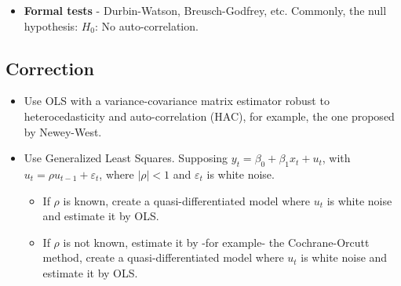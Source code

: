 \documentclass[10pt, a4paper, landscape]{extarticle}
\begin{document}
\begin{multicols}{3}
\begin{itemize}[leftmargin=*]
\begin{multicols}{3}
\begin{center}
				\end{center}
			\end{multicols}
			\item \textbf{Formal tests} - Durbin-Watson, Breusch-Godfrey, etc. Commonly, the null hypothesis: $H_0$: No auto-correlation.
		\end{itemize}
	\subsection*{Correction}
		\begin{itemize}[leftmargin=*]
			\item Use OLS with a variance-covariance matrix estimator robust to heterocedasticity and auto-correlation (HAC), for example, the one proposed by Newey-West.
			\item Use Generalized Least Squares. Supposing $y_t = \beta_0 + \beta_1 x_t + u_t$, with $u_t = \rho u_{t-1} + \varepsilon_t$, where $|\rho| < 1$ and $\varepsilon_t$ is white noise.
			\begin{itemize}[leftmargin=*]
				\item If $\rho$ is known, create a quasi-differentiated model where $u_t$ is white noise and estimate it by OLS.
				\item If $\rho$ is not known, estimate it by -for example- the Cochrane-Orcutt method, create a quasi-differentiated model where $u_t$ is white noise and estimate it by OLS.
			\end{itemize}
		\end{itemize}
\end{multicols}
\end{document}

